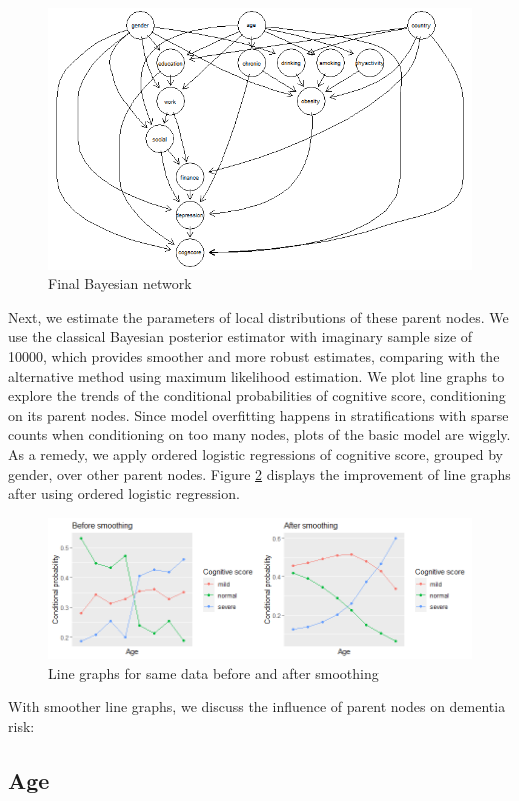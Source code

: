 \documentclass[11pt,twoside]{article}
\numberwithin{Theorem}{section}
\numberwithin{Definition}{section}
\numberwithin{Lemma}{section}
\numberwithin{Algorithm}{section}
\numberwithin{equation}{section}
\begin{document}
\begin{figure}[!h]
	\centering
	\includegraphics[width = 0.75 \textwidth]{Images/hc_mod.png}
	\caption{Final Bayesian network}
	\label{fig:hc_mod}
\end{figure}

Next, we estimate the parameters of local distributions of these parent nodes. We use the classical Bayesian posterior estimator with imaginary sample size of 10000, which provides smoother and more robust estimates, comparing with the alternative method using maximum likelihood estimation. We plot line graphs to explore the trends of the conditional probabilities of cognitive score, conditioning on its parent nodes. Since model overfitting happens in stratifications with sparse counts when conditioning on too many nodes, plots of the basic model are wiggly. As a remedy, we apply ordered logistic regressions of cognitive score, grouped by gender, over other parent nodes. Figure \ref{fig:smoothing} displays the improvement of line graphs after using ordered logistic regression.

\begin{figure}[!h]
	\centering
	\includegraphics[width = 0.85 \textwidth]{Images/smoothing.png}
	\caption{Line graphs for same data before and after smoothing}
	\label{fig:smoothing}
\end{figure}

With smoother line graphs, we discuss the influence of parent nodes on dementia risk:

\subsection{Age}
\end{document}
